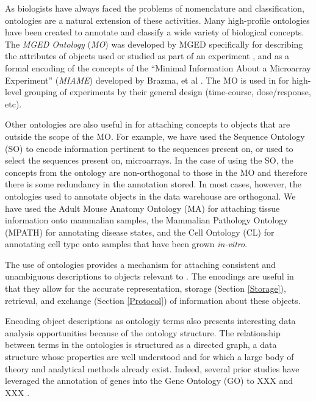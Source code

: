 As biologists have always faced the problems of nomenclature and
classification, ontologies are a natural extension of these activities.  Many
high-profile ontologies have been created to annotate and classify a wide
variety of biological concepts.  The \emph{MGED Ontology} (\emph{MO}) was
developed by MGED specifically for describing the attributes of objects used or
studied as part of an experiment \cite{XXX}, and as a formal encoding of the
concepts of the ``Minimal Information About a Microarray Experiment''
(\emph{MIAME}) developed by Brazma, et al \cite{miame}.  The MO is used
in \dbthesis for high-level grouping of experiments by their general design
(time-course, dose/response, etc).

Other ontologies are also useful in \dbthesis for attaching concepts to objects
that are outside the scope of the MO.  For example, we have used the Sequence
Ontology (SO) \cite{so} to encode information pertinent to the sequences
present on, or used to select the sequences present on, microarrays.  In
the case of using the SO, the concepts from the ontology are non-orthogonal to
those in the MO and therefore there is some redundancy in the annotation
stored.  In most cases, however, the ontologies used to annotate objects in the
data warehouse are orthogonal.  We have used the Adult Mouse Anatomy Ontology
(MA) \cite{ma} for attaching tissue information onto mammalian samples, the
Mammalian Pathology Ontology (MPATH) \cite{mpath} for annotating disease
states, and the Cell Ontology (CL) \cite{cl} for annotating cell type onto
samples that have been grown \emph{in-vitro}.

The use of ontologies provides a mechanism for attaching consistent and
unambiguous descriptions to objects relevant to \dbthesis.  The encodings are
useful in that they allow for the accurate representation, storage (Section
\ref{Storage}), retrieval, and exchange (Section \ref{Protocol}) of information
about these objects.

Encoding object descriptions as ontologiy terms also presents interesting
data analysis opportunities because of the ontology structure.   The
relationship between terms in the ontologies is structured as a directed graph,
a data structure whose properties are well understood and for which a large
body of theory and analytical methods already exist.  Indeed, several prior
studies have leveraged the annotation of genes into the Gene Ontology (GO)
\cite{go} to XXX and XXX \cite{XXX,XXX}.

